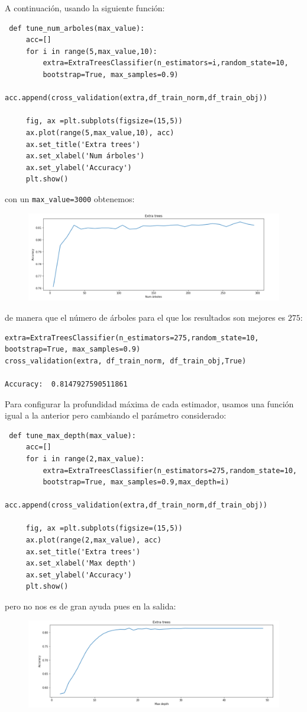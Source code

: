 \documentclass[a4paper,11pt]{article}
\begin{document}
 A continuación, usando la siguiente función:
 \begin{verbatim}
 def tune_num_arboles(max_value):
	 acc=[]
	 for i in range(5,max_value,10):
		 extra=ExtraTreesClassifier(n_estimators=i,random_state=10,
		 bootstrap=True, max_samples=0.9)
		 acc.append(cross_validation(extra,df_train_norm,df_train_obj))
	 
	 fig, ax =plt.subplots(figsize=(15,5))
	 ax.plot(range(5,max_value,10), acc)
	 ax.set_title('Extra trees')
	 ax.set_xlabel('Num árboles')
	 ax.set_ylabel('Accuracy')
	 plt.show()
 \end{verbatim}
 con un \texttt{max_value=3000} obtenemos:
 \begin{figure}[H]
 	\centering
 	\includegraphics[width=0.9\linewidth]{img/extra1}
 	\caption{}
 	\label{fig:extra1}
 \end{figure}
 
 de manera que el número de árboles para el que los resultados son mejores es $275$:
 \begin{verbatim}
extra=ExtraTreesClassifier(n_estimators=275,random_state=10,
bootstrap=True, max_samples=0.9)
cross_validation(extra, df_train_norm, df_train_obj,True)

Accuracy:  0.8147927590511861
 \end{verbatim}
 
 Para configurar la profundidad máxima de cada estimador, usamos una función igual a la anterior pero cambiando el parámetro considerado:
 
 \begin{verbatim}
 def tune_max_depth(max_value):
	 acc=[]
	 for i in range(2,max_value):
		 extra=ExtraTreesClassifier(n_estimators=275,random_state=10,
		 bootstrap=True, max_samples=0.9,max_depth=i)
		 acc.append(cross_validation(extra,df_train_norm,df_train_obj))
		 
	 fig, ax =plt.subplots(figsize=(15,5))
	 ax.plot(range(2,max_value), acc)
	 ax.set_title('Extra trees')
	 ax.set_xlabel('Max depth')
	 ax.set_ylabel('Accuracy')
	 plt.show()
 \end{verbatim}
 pero no nos es de gran ayuda pues en la salida:
 \begin{figure}[H]
 	\centering
 	\includegraphics[width=0.9\linewidth]{img/extra2}
 	\caption{}
 	\label{fig:extra2}
 \end{figure}
 
\end{document}
